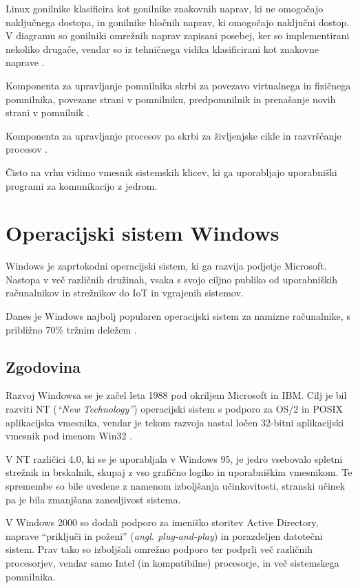 \documentclass[a4paper,12pt,openright]{book}
\begin{document}
Linux gonilnike klasificira kot gonilnike znakovnih naprav, ki ne omogočajo naključnega dostopa, in gonilnike bločnih naprav, ki omogočajo naključni dostop.
V diagramu so gonilniki omrežnih naprav zapisani posebej, ker so implementirani nekoliko drugače, vendar so iz tehničnega vidika klasificirani kot znakovne naprave \cite{Tanenbaum_Bos_2023}.

Komponenta za upravljanje pomnilnika skrbi za povezavo virtualnega in fizičnega pomnilnika, povezane strani v pomnilniku, predpomnilnik in prenašanje novih strani v pomnilnik \cite{Tanenbaum_Bos_2023}.

Komponenta za upravljanje procesov pa skrbi za življenjske cikle in razvr\-ščanje procesov \cite{Tanenbaum_Bos_2023}.

Čisto na vrhu vidimo vmesnik sistemskih klicev, ki ga uporabljajo uporabniški programi za komunikacijo z jedrom.

\section{Operacijski sistem Windows}

Windows je zaprtokodni operacijski sistem, ki ga razvija podjetje Microsoft.
Nastopa v več različnih družinah, vsaka s svojo ciljno publiko od uporabniških računalnikov in strežnikov do IoT in vgrajenih sistemov.

Danes je Windows najbolj popularen operacijski sistem za namizne raču\-nalnike, s približno 70\% tržnim deležem \cite{Statcounter_OS_2024}.

\subsection{Zgodovina}

Razvoj Windowsa se je začel leta 1988 pod okriljem Microsoft in IBM.
Cilj je bil razviti NT (\textit{``New Technology''}) operacijski sistem s podporo za OS/2 in POSIX aplikacijska vmesnika, vendar je tekom razvoja nastal ločen 32-bitni aplikacijski vmesnik pod imenom Win32 \cite{Silberschatz_Galvin_Gagne_2018}.

V NT različici 4.0, ki se je uporabljala v Windows 95, je jedro vsebovalo spletni strežnik in brskalnik, skupaj z vso grafično logiko in uporabniškim vmesnikom.
Te spremembe so bile uvedene z namenom izboljšanja učinkovitosti, stranski učinek pa je bila zmanjšana zanesljivost sistema.

V Windows 2000 so dodali podporo za imeniško storitev Active Directory, naprave ``priključi in poženi'' (\textit{angl. plug-and-play}) in porazdeljen datotečni sistem.
Prav tako so izboljšali omrežno podporo ter podprli več različnih procesorjev, vendar samo Intel (in kompatibilne) procesorje, in več sistemskega pomnilnika.
\end{document}
